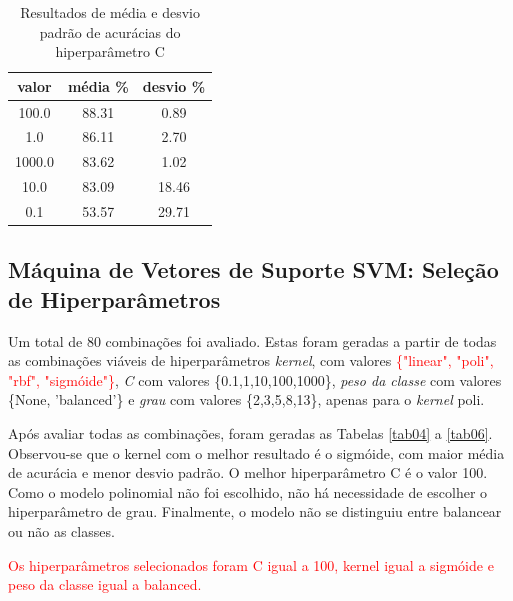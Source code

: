 \begin{table}[!htpp]
	\vspace{0.3cm}
  \caption{Resultados de média e desvio padrão de acurácias do hiperparâmetro C}
	\vspace{-0.6cm}
	\label{tab03}
	\renewcommand{\arraystretch}{1.2}
	\begin{center}
\begin{tabular}{ccc}
\hline
\textbf{valor} &	\textbf{média \%}	& \textbf{desvio \%}\\
\hline		
 100.0 & 88.31 & 0.89 \\
   1.0 & 86.11 & 2.70 \\
1000.0 & 83.62 & 1.02 \\
  10.0 & 83.09 & 18.46 \\
   0.1 & 53.57 & 29.71 \\
\hline
\end{tabular}
\end{center}
\end{table}

\subsection*{Máquina de Vetores de Suporte SVM: Seleção de Hiperparâmetros}

Um total de 80 combinações foi avaliado. Estas foram geradas a partir de todas as combinações viáveis de hiperparâmetros \textit{kernel}, com valores \textcolor{red}{\{"linear", "poli", "rbf", "sigmóide"\}}, \textit{C} com valores \{0.1,1,10,100,1000\}, \textit{peso da classe} com valores \{None, 'balanced'\} e \textit{grau} com valores \{2,3,5,8,13\}, apenas para o \textit{kernel} poli.

Após avaliar todas as combinações, foram geradas as Tabelas \ref{tab04} a \ref{tab06}. Observou-se que o kernel com o melhor resultado é o sigmóide, com maior média de acurácia e menor desvio padrão. O melhor hiperparâmetro C é o valor 100. Como o modelo polinomial não foi escolhido, não há necessidade de escolher o hiperparâmetro de grau. Finalmente, o modelo não se distinguiu entre balancear ou não as classes.

\textcolor{red}{
Os hiperparâmetros selecionados foram C igual a 100, kernel igual a sigmóide e peso da classe igual a balanced.}

